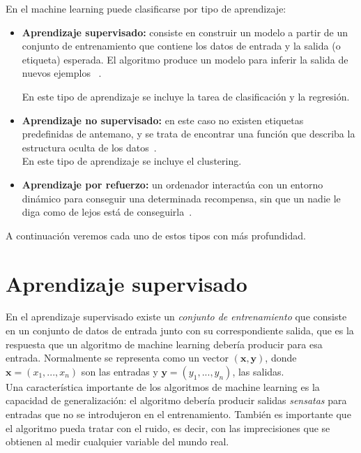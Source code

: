 En el machine learning puede clasificarse por tipo de aprendizaje:

\begin{itemize}
	\item \textbf{Aprendizaje supervisado:} consiste en construir un modelo a partir de un conjunto de entrenamiento que contiene los datos de entrada y la salida (o etiqueta) esperada. El algoritmo produce un modelo para inferir la salida de nuevos ejemplos ~\cite[pág~ 7]{Marsland:2009:MLA:1571643}.
	
	En este tipo de aprendizaje se incluye la tarea de clasificación y la regresión.
	
	\item \textbf{Aprendizaje no supervisado:} en este caso no existen etiquetas predefinidas de antemano, y se trata de encontrar una función que describa la estructura oculta de los datos~\cite[pág 195]{Marsland:2009:MLA:1571643}.\\
	
	En este tipo de aprendizaje se incluye el clustering.
	
	\item \textbf{Aprendizaje por refuerzo:} un ordenador interactúa con un entorno dinámico para conseguir una determinada recompensa, sin que un nadie le diga como de lejos está de conseguirla~\cite[pág 4]{Sutton:1998:IRL:551283}.  
\end{itemize}

A continuación veremos cada uno de estos tipos con más profundidad.

\section{Aprendizaje supervisado}

En el aprendizaje supervisado existe un \textit{conjunto de entrenamiento} que consiste en un conjunto de datos de entrada junto con su correspondiente salida, que es la respuesta que un algoritmo de machine learning debería producir para esa entrada. Normalmente se representa como un vector $(\mathbf{x}, \mathbf{y})$, donde $\mathbf{x} = (x_1,...,x_n)$ son las entradas y $\mathbf{y} = (y_1,...,y_n)$, las salidas.\\

Una característica importante de los algoritmos de machine learning es la capacidad de generalización: el algoritmo debería producir salidas \textit{sensatas} para entradas que no se introdujeron en el entrenamiento. También es importante que el algoritmo pueda tratar con el ruido, es decir, con las imprecisiones que se  obtienen al medir cualquier variable del mundo real.\\

